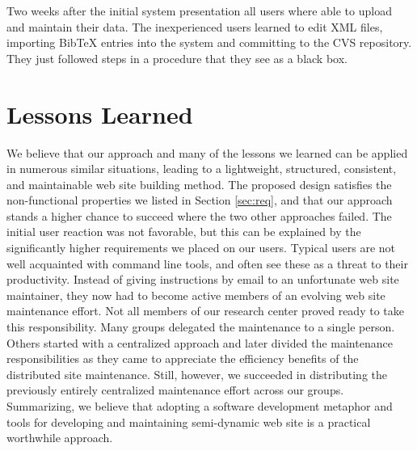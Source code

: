 \documentclass[10pt]{article}
\begin{document}
Two weeks after the initial system presentation all users where able to upload 
and maintain their data. The inexperienced users learned to edit {\sc XML} files,
importing {\sc BibTeX} entries into the system and committing to the {\sc CVS} repository. 
They just followed steps in a procedure that they see as a black box. 

\section{Lessons Learned}
\label{sec:concl}

We believe that our approach and many of the lessons we learned
can be applied in numerous similar situations,
leading to a lightweight, structured, consistent, and maintainable
web site building method. The proposed design satisfies the non-functional properties
we listed in Section \ref{sec:req},
and that our approach stands a higher chance to succeed where the
two other approaches failed.
The initial user reaction was not favorable, but this can
be explained by the significantly higher requirements we
placed on our users. Typical users are not well acquainted
with command line tools, and often see these as a threat to their productivity.
Instead of giving instructions by email to an unfortunate
web site maintainer, they now had to become active members
of an evolving web site maintenance effort.
Not all members of our research center proved ready to take
this responsibility.
Many groups delegated the maintenance to a single person. 
Others started with a centralized approach and later divided the
maintenance responsibilities as they came to appreciate the efficiency
benefits of the distributed site maintenance.
Still, however, we succeeded in distributing the previously
entirely centralized maintenance effort across our groups.
Summarizing, we believe that adopting a software development
metaphor and tools for developing and maintaining semi-dynamic
web site is a practical worthwhile approach.
\end{document}

